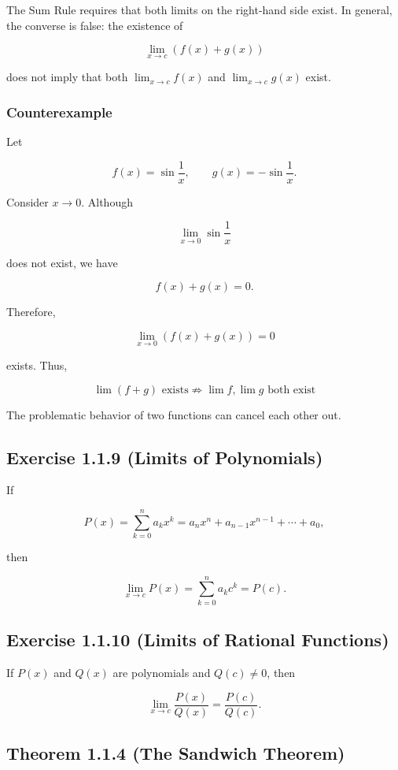 \documentclass[11pt,a4paper]{article}
\begin{document}
The Sum Rule requires that both limits on the right-hand side exist. In
general, the converse is false: the existence of

\[
\lim_{x\to c}(f(x)+g(x))
\]

does not imply that both \(\lim_{x\to c}f(x)\) and \(\lim_{x\to c}g(x)\)
exist.

\subsubsection{Counterexample}\label{counterexample}

Let

\[
f(x)=\sin\frac{1}{x},
\qquad
g(x)=-\sin\frac{1}{x}.
\]

Consider \(x\to0\). Although

\[
\lim_{x\to0}\sin\frac{1}{x}
\]

does not exist, we have

\[
f(x)+g(x)=0.
\]

Therefore,

\[
\lim_{x\to0}(f(x)+g(x))=0
\]

exists. Thus,

\[
\boxed{
\lim(f+g)\text{ exists}
\not\Longrightarrow
\lim f,\lim g\text{ both exist}
}
\]

The problematic behavior of two functions can cancel each other out.

\subsection{Exercise 1.1.9 (Limits of
Polynomials)}\label{exercise-1.1.9-limits-of-polynomials}

If

\[
P(x)=\sum_{k=0}^{n}a_kx^k
=a_nx^n+a_{n-1}x^{n-1}+\cdots+a_0,
\]

then

\[
\lim_{x\to c}P(x)
=\sum_{k=0}^{n}a_kc^k
=P(c).
\]

\subsection{Exercise 1.1.10 (Limits of Rational
Functions)}\label{exercise-1.1.10-limits-of-rational-functions}

If \(P(x)\) and \(Q(x)\) are polynomials and \(Q(c)\ne0\), then

\[
\lim_{x\to c}\frac{P(x)}{Q(x)}=\frac{P(c)}{Q(c)}.
\]

\subsection{Theorem 1.1.4 (The Sandwich
Theorem)}\label{theorem-1.1.4-the-sandwich-theorem}
\end{document}
